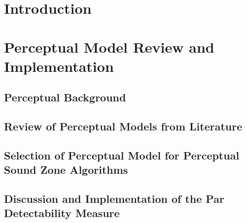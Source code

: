 \documentclass[10pt,twoside,openright,titlepage]{ce}
\begin{document}
\frontmatter
\makecover
\maketitle
\makesignature


\tableofcontents
\mainmatter

\chapter{Introduction}
\label{ch:introduction}

\newpage


\chapter{Perceptual Model Review and Implementation}
\label{ch:perceptual}
% 
\section{Perceptual Background}
\label{ch:perceptual:background}

\newpage
\section{Review of Perceptual Models from Literature}
\label{ch:perceptual:review}

\newpage
\section{Selection of Perceptual Model for Perceptual Sound Zone Algorithms}
\label{ch:perceptual:selection}

\newpage
\section{Discussion and Implementation of the Par Detectability Measure}
\label{ch:perceptual:implementation}

\newpage
% 
\end{document}
